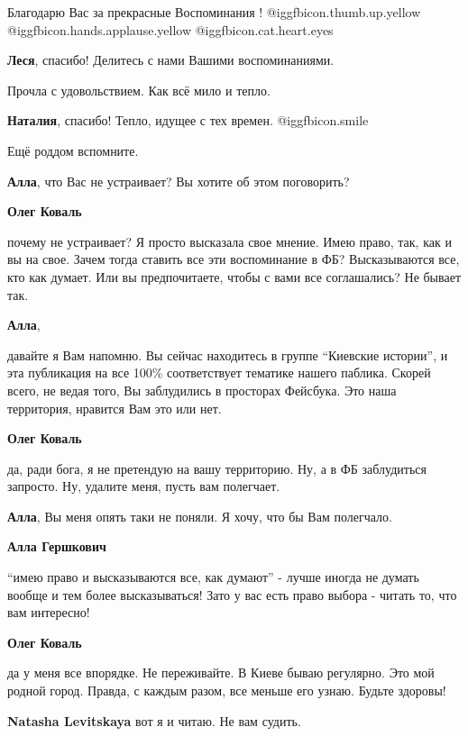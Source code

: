 \begin{itemize}
Благодарю Вас за прекрасные Воспоминания ! @igg{fbicon.thumb.up.yellow}
@igg{fbicon.hands.applause.yellow}  @igg{fbicon.cat.heart.eyes} 

\textbf{Леся}, спасибо! Делитесь с нами Вашими воспоминаниями.

Прочла с удовольствием. Как всё мило и тепло.

\textbf{Наталия}, спасибо! Тепло, идущее с тех времен. @igg{fbicon.smile} 

Ещё роддом вспомните.

\begin{itemize} %
\textbf{Алла}, что Вас не устраивает? Вы хотите об этом поговорить?

\begin{itemize} %
\textbf{Олег Коваль} 

почему не устраивает? Я просто высказала свое мнение. Имею право, так, как и вы
на свое. Зачем тогда ставить все эти воспоминание в ФБ? Высказываются все, кто
как думает. Или вы предпочитаете, чтобы с вами все соглашались? Не бывает так.

\textbf{Алла}, 

давайте я Вам напомню. Вы сейчас находитесь в группе \enquote{Киевские истории}, и эта
публикация на все 100\% соответствует тематике нашего паблика. Скорей всего, не
ведая того, Вы заблудились в просторах Фейсбука. Это наша территория, нравится
Вам это или нет.

\textbf{Олег Коваль} 

да, ради бога, я не претендую на вашу территорию. Ну, а в ФБ заблудиться
запросто. Ну, удалите меня, пусть вам полегчает.

\textbf{Алла}, Вы меня опять таки не поняли. Я хочу, что бы Вам полегчало.

\textbf{Алла Гершкович}

\enquote{имею право и высказываются все, как думают} - лучше иногда не думать вообще и тем более высказываться!
Зато у вас есть право выбора - читать то, что вам интересно!


\textbf{Олег Коваль} 

да у меня все впорядке. Не переживайте. В Киеве бываю регулярно. Это мой родной
город. Правда, с каждым разом, все меньше его узнаю. Будьте здоровы!


\textbf{Natasha Levitskaya} вот я и читаю. Не вам судить.


\end{itemize}
\end{itemize}
\end{itemize}
